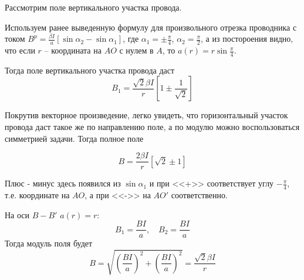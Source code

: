\documentclass[a4paper,14pt]{extarticle}
\begin{document}
\begin{figure}[H]
\end{figure}

Рассмотрим поле вертикального участка провода. 

Используем ранее выведенную формулу для произвольного отрезка проводника с током $B^p=\frac{\beta I}{a}[\sin\alpha_2-\sin\alpha_1]$, где $\alpha_1=\pm\frac{\pi}{4}$, $\alpha_2=\frac{\pi}{2}$, а из постороения видно, что если $r$ -- координата на $AO$ с нулем в $A$, то $a(r)=r\sin\frac{\pi}{4}$. 

Тогда поле вертикального участка провода даст
\begin{equation*}
    B_1=\frac{\sqrt{2}\beta I}{r}[1\pm\frac{1}{\sqrt{2}}]
\end{equation*}

Покрутив векторное произведение, легко увидеть, что горизонтальный участок провода даст такое же по направлению поле, а по модулю можно воспользоваться симметрией задачи. Тогда полное поле

\begin{equation*}
    B=\frac{2\beta I}{r}[\sqrt{2}\pm1]
\end{equation*}

Плюс - минус здесь появился из $\sin\alpha_1$ и при <<+>> соответствует углу 
$-\frac{\pi}{4}$, т.е. координате на $AO$, а при <<->> на $AO'$ соответственно.

На оси $B-B'$ $a(r)=r$:
\begin{equation}
    B_1=\frac{BI}{a},\quad
    B_2=\frac{BI}{a}
\end{equation}
Тогда модуль поля будет
\begin{equation*}
    B=\sqrt{\left(\frac{BI}{a}\right)^2+\left(\frac{BI}{a}\right)^2}=
        \frac{\sqrt{2}\beta I}{r}
\end{equation*}
\end{document}
